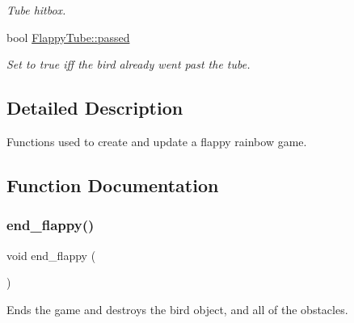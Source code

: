 \begin{DoxyCompactItemize}
\begin{DoxyCompactList}\small\item\em Tube hitbox. \end{DoxyCompactList}\item 
bool \mbox{\hyperlink{group__flappy_ga70babf0470365a943ad6743479a05726}{Flappy\+Tube\+::passed}}
\begin{DoxyCompactList}\small\item\em Set to true iff the bird already went past the tube. \end{DoxyCompactList}\end{DoxyCompactItemize}


\subsection{Detailed Description}
Functions used to create and update a flappy rainbow game. 

\subsection{Function Documentation}
\mbox{\label{group__flappy_gae94076e45a9cafba1b36efea470aea73}} 
\subsubsection{\texorpdfstring{end\+\_\+flappy()}{end\_flappy()}}
{\footnotesize\ttfamily void end\+\_\+flappy (\begin{DoxyParamCaption}{ }\end{DoxyParamCaption})}



Ends the game and destroys the bird object, and all of the obstacles. 

